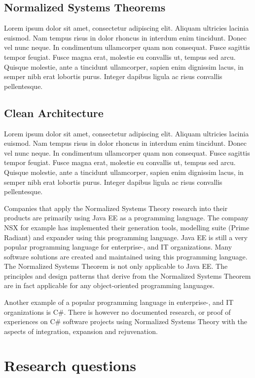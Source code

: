 \subsection{Normalized Systems Theorems}
Lorem ipsum dolor sit amet, consectetur adipiscing elit. Aliquam ultricies lacinia
euismod. Nam tempus risus in dolor rhoncus in interdum enim tincidunt. Donec vel nunc
neque. In condimentum ullamcorper quam non consequat. Fusce sagittis tempor feugiat. Fusce
magna erat, molestie eu convallis ut, tempus sed arcu. Quisque molestie, ante a tincidunt
ullamcorper, sapien enim dignissim lacus, in semper nibh erat lobortis purus. Integer
dapibus ligula ac risus convallis pellentesque.

\subsection{Clean Architecture}
Lorem ipsum dolor sit amet, consectetur adipiscing elit. Aliquam ultricies lacinia
euismod. Nam tempus risus in dolor rhoncus in interdum enim tincidunt. Donec vel nunc
neque. In condimentum ullamcorper quam non consequat. Fusce sagittis tempor feugiat. Fusce
magna erat, molestie eu convallis ut, tempus sed arcu. Quisque molestie, ante a tincidunt
ullamcorper, sapien enim dignissim lacus, in semper nibh erat lobortis purus. Integer
dapibus ligula ac risus convallis pellentesque.

Companies that apply the Normalized Systems Theory research into their products are
primarily using Java EE as a programming language. The company NSX for example has
implemented their generation tools, modelling suite (Prime Radiant) and expander using
this programming language. Java EE is still a very popular programming language for
enterprise-, and IT organizations. Many software solutions are created and maintained
using this programming language. The Normalized Systems Theorem is not only applicable to
Java EE. The principles and design patterns that derive from the Normalized Systems
Theorem are in fact applicable for any object-oriented programming languages. 

Another example of a popular programming language in enterprise-, and IT organizations is
C\#. There is however no documented research, or proof of experiences on C\# software
projects using Normalized Systems Theory with the aspects of integration, expansion and
rejuvenation.





\section{Research questions} \label{ResearchQuestions}